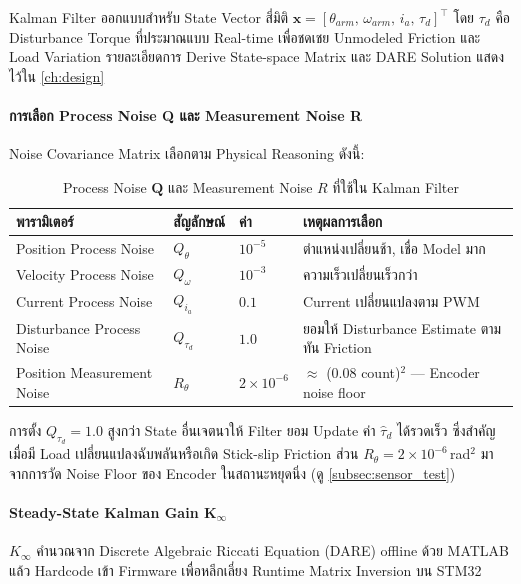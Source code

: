 Kalman Filter ออกแบบสำหรับ State Vector สี่มิติ
$\mathbf{x} = [\theta_{arm},\, \omega_{arm},\, i_a,\, \tau_d]^\top$
โดย $\tau_d$ คือ Disturbance Torque ที่ประมาณแบบ Real-time
เพื่อชดเชย Unmodeled Friction และ Load Variation
รายละเอียดการ Derive State-space Matrix และ DARE Solution
แสดงไว้ใน \cref{ch:design}

\paragraph{การเลือก Process Noise Q และ Measurement Noise R}
Noise Covariance Matrix เลือกตาม Physical Reasoning ดังนี้:

\begin{table}[H]
  \centering
  \caption{Process Noise $\mathbf{Q}$ และ Measurement Noise $R$
           ที่ใช้ใน Kalman Filter}
  \label{tab:kalman_qr}
  \small
  \begin{tabular}{>{\raggedright\arraybackslash}p{3.0cm} >{\centering\arraybackslash}p{1.5cm} >{\centering\arraybackslash}p{1.5cm} >{\raggedright\arraybackslash}p{7.0cm}}
    \toprule
    พารามิเตอร์ & สัญลักษณ์ & ค่า & เหตุผลการเลือก \\
    \midrule
    Position Process Noise    & $Q_\theta$ & $10^{-5}$ & ตำแหน่งเปลี่ยนช้า, เชื่อ Model มาก \\
    Velocity Process Noise    & $Q_\omega$ & $10^{-3}$ & ความเร็วเปลี่ยนเร็วกว่า \\
    Current Process Noise     & $Q_{i_a}$  & $0.1$     & Current เปลี่ยนแปลงตาม PWM \\
    Disturbance Process Noise & $Q_{\tau_d}$& $1.0$    & ยอมให้ Disturbance Estimate ตามทัน Friction \\
    Position Measurement Noise& $R_\theta$ & $2\times10^{-6}$ & $\approx$ (0.08 count)$^2$ — Encoder noise floor \\
    \bottomrule
  \end{tabular}
\end{table}

การตั้ง $Q_{\tau_d} = 1.0$ สูงกว่า State อื่นเจตนาให้ Filter
ยอม Update ค่า $\hat{\tau}_d$ ได้รวดเร็ว ซึ่งสำคัญเมื่อมี
Load เปลี่ยนแปลงฉับพลันหรือเกิด Stick-slip Friction
ส่วน $R_\theta = 2\times10^{-6}$\,rad$^2$ มาจากการวัด Noise Floor
ของ Encoder ในสถานะหยุดนิ่ง (ดู \cref{subsec:sensor_test})

\paragraph{Steady-State Kalman Gain $\mathbf{K}_\infty$}
$K_\infty$ คำนวณจาก Discrete Algebraic Riccati Equation (DARE)
offline ด้วย MATLAB แล้ว Hardcode เข้า Firmware
เพื่อหลีกเลี่ยง Runtime Matrix Inversion บน STM32

